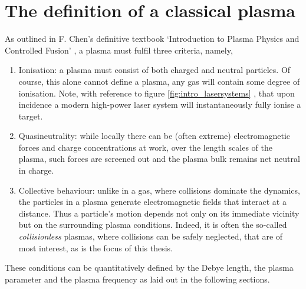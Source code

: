 \section{\label{sec:plasma_def}The definition of a classical plasma}
As outlined in F. Chen's definitive textbook `Introduction to Plasma Physics and Controlled Fusion' \cite{chenIntroductionPlasmaPhysics2016}, a plasma must fulfil three criteria, namely,
\begin{enumerate}
	\item Ionisation: a plasma must consist of both charged and neutral particles. Of course, this alone cannot define a plasma, any gas will contain some degree of ionisation. Note, with reference to figure \ref{fig:intro_lasersystems} \cite{umstadterRelativisticLaserPlasma2003}, that upon incidence a modern high-power laser system will instantaneously fully ionise a target.
	\item Quasineutrality: while locally there can be (often extreme) electromagnetic forces and charge concentrations at work, over the length scales of the plasma, such forces are screened out and the plasma bulk remains net neutral in charge.
	\item Collective behaviour: unlike in a gas, where collisions dominate the dynamics, the particles in a plasma generate electromagnetic fields that interact at a distance. Thus a particle's motion depends not only on its immediate vicinity but on the surrounding plasma conditions. Indeed, it is often the so-called \textit{collisionless} plasmas, where collisions can be safely neglected, that are of most interest, as is the focus of this thesis.
\end{enumerate}

These conditions can be quantitatively defined by the Debye length, the plasma parameter and the plasma frequency as laid out in the following sections.

